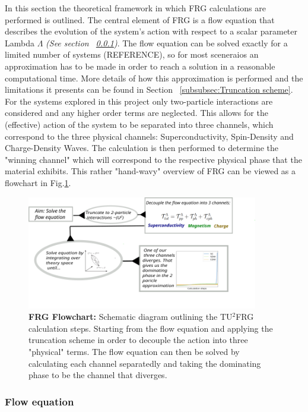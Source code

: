 \documentclass[12pt]{article}
\begin{document}
In this section the theoretical framework in which FRG calculations are performed is outlined. The central element of FRG is a flow equation that describes the evolution of the system's action with respect to a scalar parameter Lambda $\Lambda$ \textit{(See section ~\ref{subsubsec:Flow Equation})}.
The flow equation can be solved exactly for a limited number of systems (REFERENCE), so for most sceneraios an approximation has to be made in order to reach a solution in a reasonable computational time. More details of how this approximation is performed and the limitations it presents can be found in Section ~\ref{subsubsec:Truncation scheme}. For the systems explored in this project only two-particle
interactions are considered and any higher order terms are neglected.
This allows for the (effective) action of the system to be separated into three channels, which correspond to the three physical channels: Superconductivity, Spin-Density and Charge-Density Waves.
The calculation is then performed to determine the "winning channel" which will correspond to the respective physical phase that the material exhibits. This rather "hand-wavy" overview of FRG can be viewed as a flowchart in Fig.\ref{fig:FRGflowdiagram}.

\begin{figure}[htbp]  %
    \centering
    \includegraphics[width=0.9\textwidth]{FRGflowdiagram.png}  %
    \caption{\textbf{FRG Flowchart:} Schematic diagram outlining the TU$^2$FRG calculation steps. Starting from the flow equation and applying the truncation scheme in order to decouple the action into three "physical" terms. 
    The flow equation can then be solved by calculating each channel separatedly and taking the dominating phase to be the channel that diverges.}
    \label{fig:FRGflowdiagram}
\end{figure}

\subsubsection{Flow equation}
\label{subsubsec:Flow Equation}
\end{document}
